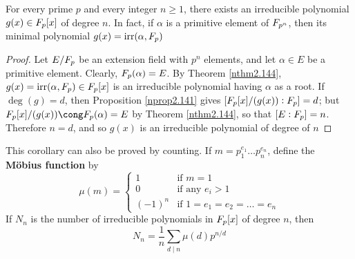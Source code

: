 \documentclass[11pt]{article}
\begin{document}
\begin{corollary}[]
\label{ncor2.154}
For every prime \(p\) and every integer \(n\ge1\), there exists an irreducible
polynomial \(g(x)\in\relax{F}_p[x]\) of degree \(n\). In fact, if \(\alpha\) is a primitive
element of \(\relax{F}_{p^n}\), then its minimal polynomial \(g(x)=\operatorname{irr}(\alpha,\relax{F}_p)\)
\end{corollary}

\begin{proof}
Let \(E/\relax{F}_p\) be an extension field with \(p^n\) elements, and let
\(\alpha\in E\) be a primitive element. Clearly, \(\relax{F}_p(\alpha)=E\). By Theorem 
\ref{nthm2.144}, \(g(x)=\operatorname{irr}(\alpha,\relax{F}_p)\in\relax{F}_p[x]\) is an irreducible polynomial
having \(\alpha\) as a root. If \(\deg(g)=d\), then Proposition \ref{nprop2.141} gives 
\([\relax{F}_p[x]/(g(x)):\relax{F}_p]=d\); but \(\F_p[x]/(g(x))\cong\F_p(\alpha)=E\) by Theorem
\ref{nthm2.144}, so that \([E:\relax{F}_p]=n\). Therefore \(n=d\), and so \(g(x)\) is
an irreducible polynomial of degree of \(n\)
\end{proof}

This corollary can also be proved by counting. If \(m=p_1^{e_1}\dots
   p_n^{e_n}\), define the \textbf{Möbius function} by
\begin{equation*}
\mu(m)=
\begin{cases}
1&\text{if }m=1\\
0&\text{if any }e_i>1\\
(-1)^n&\text{if }1=e_1=e_2=\dots=e_n
\end{cases}
\end{equation*}
If \(N_n\) is the number of irreducible polynomials in \(\relax{F}_p[x]\) of degree
\(n\), then
\begin{equation*}
N_n=\frac{1}{n}\sum_{d\mid n}\mu(d)p^{n/d}
\end{equation*}
\end{document}
